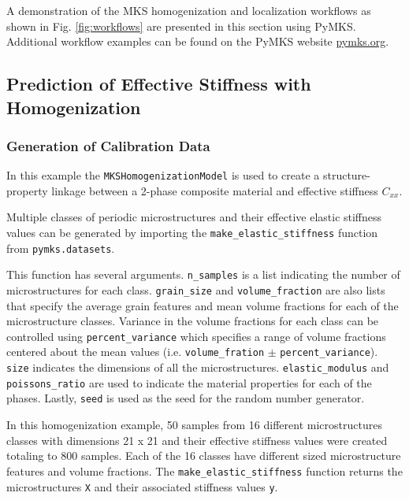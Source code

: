 \documentclass{bmcart}
\begin{document}
A demonstration of the MKS homogenization and localization
workflows as shown in Fig. \ref{fig:workflows}
are presented in this section using PyMKS. Additional workflow examples
can be found on the PyMKS website \url{pymks.org}.

\subsection{Prediction of Effective Stiffness with
Homogenization}\label{prediction-of-effective-stiffness-with-homogenization}

    \subsubsection{Generation of Calibration Data}\label{calibration-data-generation}

In this example the \texttt{MKSHomogenizationModel} is used to create a
structure-property linkage between a 2-phase composite material and
effective stiffness \(C_{xx}\).

Multiple classes of periodic microstructures and their effective elastic
stiffness values can be generated by importing the
\texttt{make\_elastic\_stiffness} function from \texttt{pymks.datasets}.

This function has several arguments. \texttt{n\_samples} is a list
indicating the number of microstructures for each class.
\texttt{grain\_size} and \texttt{volume\_fraction} are also lists that
specify the average grain features and mean volume fractions for each of
the microstructure classes. Variance in the volume fractions for each
class can be controlled using \texttt{percent\_variance} which specifies
a range of volume fractions centered about the mean values (i.e.
\texttt{volume\_fration} \(\pm\) \texttt{percent\_variance}).
\texttt{size} indicates the dimensions of all the microstructures.
\texttt{elastic\_modulus} and \texttt{poissons\_ratio} are used to
indicate the material properties for each of the phases. Lastly,
\texttt{seed} is used as the seed for the random number generator.

In this homogenization example, 50 samples from 16 different
microstructures classes with dimensions 21 x 21 and their effective
stiffness values were created totaling to 800 samples. Each of the 16
classes have different sized microstructure features and volume
fractions. The \texttt{make\_elastic\_stiffness} function returns the
microstructures \texttt{X} and their associated stiffness values
\texttt{y}.
\end{document}
